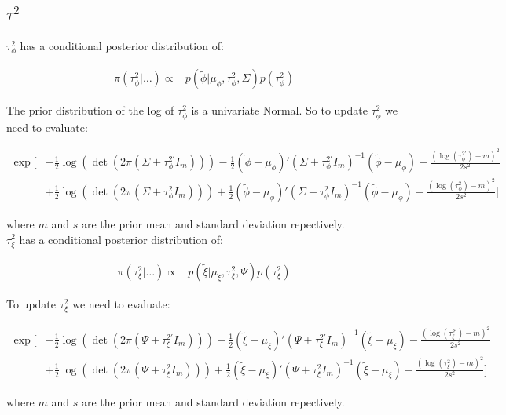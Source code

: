 \documentclass{article}
\begin{document}
\subsection{$\tau^2$}

$\tau^2_\phi$ has a conditional posterior distribution of:

\begin{align*}
\pi(\tau^2_\phi | \dots ) \propto & p(\tilde{\phi} | \mu_\phi, \tau^2_\phi, \Sigma) p(\tau^2_\phi)
\end{align*}

The prior distribution of the log of $\tau^2_\phi$ is a univariate Normal. So to update $\tau^2_\phi$ we need to evaluate:

\begin{align}
\exp \Bigg[ & - \frac{1}{2}  \log(\det(2 \pi (\Sigma + \tau^{2'}_\phi I_m))) -\frac{1}{2}  (\tilde{\phi} - \mu_\phi)' (\Sigma + \tau^{2'}_\phi I_m)^{-1} (\tilde{\phi} - \mu_\phi) - \frac{(\log(\tau^{2'}_\phi) - m)^2}{2 s^2} \nonumber \\
& +  \frac{1}{2}  \log(\det(2 \pi (\Sigma + \tau^2_\phi I_m))) +  \frac{1}{2} (\tilde{\phi} - \mu_\phi)' (\Sigma + \tau^2_\phi I_m)^{-1} (\tilde{\phi} - \mu_\phi) + \frac{(\log(\tau^2_\phi) - m)^2}{2 s^2} \Bigg] \label{eq:2t1}
\end{align}

where $m$ and $s$ are the prior mean and standard deviation repectively. \\

$\tau^2_\xi$ has a conditional posterior distribution of:

\begin{align*}
\pi(\tau^2_\xi | \dots ) \propto & p(\tilde{\xi} | \mu_\xi, \tau^2_\xi, \Psi) p(\tau^2_\xi)
\end{align*}

To update $\tau^2_\xi$ we need to evaluate:

\begin{align}
\exp \Bigg[ & -\frac{1}{2} \log(\det(2 \pi (\Psi + \tau^{2'}_\xi I_m))) -\frac{1}{2}  (\tilde{\xi} - \mu_\xi)' (\Psi + \tau^{2'}_\xi I_m)^{-1} (\tilde{\xi} - \mu_\xi) - \frac{(\log(\tau^{2'}_\xi) - m)^2}{2 s^2} \nonumber \\
& + \frac{1}{2} \log(\det(2 \pi (\Psi + \tau^{2}_\xi I_m))) +  \frac{1}{2} (\tilde{\xi} - \mu_\xi)' (\Psi + \tau^2_\xi I_m)^{-1} (\tilde{\xi} - \mu_\xi) + \frac{(\log(\tau^2_\xi) - m)^2}{2 s^2} \Bigg] \label{eq:2t2}
\end{align}

where $m$ and $s$ are the prior mean and standard deviation repectively. \\
\end{document}
